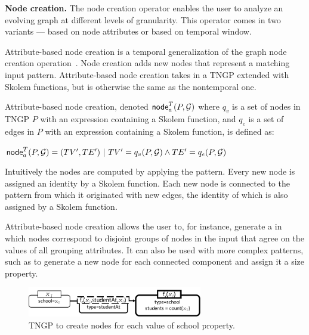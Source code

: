 {\bf Node creation.}  The node creation operator enables the user to
analyze an evolving graph at different levels of granularity.  This
operator comes in two variants --- based on node attributes or based
on temporal window.

Attribute-based node creation is a temporal generalization of the
graph node creation operation~\cite{Wood2012}.  Node creation adds new
nodes that represent a matching input pattern.  Attribute-based node
creation takes in a TNGP extended with Skolem functions, but is
otherwise the same as the nontemporal one.

\begin{definition}
\label{def:nodecra}
Attribute-based node creation, denoted $\textsf{node}^T_a(P,\mathcal{G})$
where $q_v$ is a set of nodes in TNGP $P$ with an expression containing a
Skolem function, and $q_e$ is a set of edges in $P$ with an expression
containing a Skolem function, is defined as:

$\textsf{node}^T_a(P,\mathcal{G}) = (TV',TE') ~|~ TV' = q_v(P,\mathcal{G}) \land TE' = q_e(P,\mathcal{G})$
\end{definition}

Intuitively the nodes are computed
by applying the pattern.  Every new node is assigned an identity by a
Skolem function.  Each new node is connected to the pattern from which
it originated with new edges, the identity of which is also assigned
by a Skolem function.

Attribute-based node creation allows the user to, for instance,
generate a \tg in which nodes correspond to disjoint groups of nodes
in the input that agree on the values of all grouping attributes.  It
can also be used with more complex patterns, such as to generate a new
node for each connected component and assign it a size property.

\begin{figure}
\centering
\includegraphics[width=3in]{figs/schoolncr.pdf}
\caption{TNGP to create nodes for each value of school property.}
\vspace{-0.2cm}
\label{fig:schoolncr}
\vspace{-0.2cm}
\end{figure}

